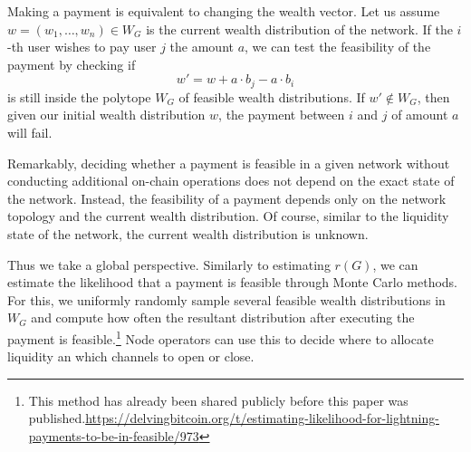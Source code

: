 \documentclass[10pt,twocolumn]{article}
\begin{document}

Making a payment is equivalent to changing the wealth vector.  
Let us assume \( w = (w_1, \dots, w_n) \in W_G \) is the current wealth distribution of the network.  
If the \( i \)-th user wishes to pay user \( j \) the amount \( a \), we can test the feasibility of the payment by checking if  
\begin{equation}
  \label{eq:payment}
  w' = w + a \cdot b_j - a \cdot b_i
\end{equation}
is still inside the polytope \( W_G \) of feasible wealth distributions.  
If \( w' \notin W_G \), then given our initial wealth distribution \( w \), the payment between \( i \) and \( j \) of amount \( a \) will fail.  

Remarkably, deciding whether a payment is feasible in a given network without conducting additional on-chain operations does not depend on the exact state of the network.  
Instead, the feasibility of a payment depends only on the network topology and the current wealth distribution.  
Of course, similar to the liquidity state of the network, the current wealth distribution is unknown. 

Thus we take a global perspective.
Similarly to estimating \( r(G) \), we can estimate the likelihood that a payment is feasible through Monte Carlo methods.
For this, we uniformly randomly sample several feasible wealth distributions in \( W_G \) and compute how often the resultant distribution after executing the payment is feasible.\footnote{This method has already been shared publicly before this paper was published.\url{https://delvingbitcoin.org/t/estimating-likelihood-for-lightning-payments-to-be-in-feasible/973}}
Node operators can use this to decide where to allocate liquidity an which channels to open or close.  
\end{document}
